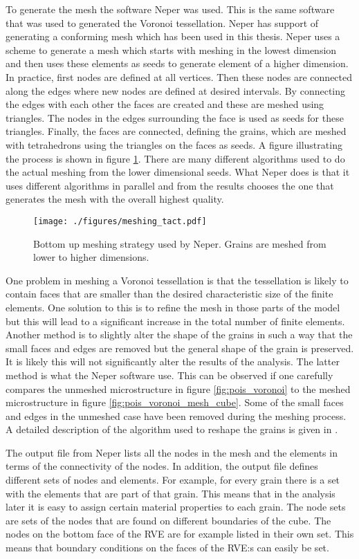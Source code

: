 \documentclass[meshing_micro.tex]{subfiles}
\begin{document}
To generate the mesh the software Neper\cite{Quey20111729} was used. 
This is the same software that was used to generated the Voronoi tessellation. Neper has support of generating a conforming mesh which has been used in this thesis. Neper uses a scheme to generate a mesh which starts with meshing in the lowest dimension and then uses these elements as seeds to generate element of a higher dimension.  In practice, first nodes are defined at all vertices. Then these nodes are connected along the edges where new nodes are defined at desired intervals. 
By connecting the edges with each other the faces are created and these are meshed using triangles. The nodes in the edges surrounding the face is used as seeds for these triangles. Finally, the faces are connected, defining the grains, which are meshed with tetrahedrons using the triangles on the faces as seeds. A figure illustrating the process is shown in figure \ref{fig:mesh_strat}. There are many different algorithms used to do the actual meshing from the lower dimensional seeds. 
What Neper does is that it uses different algorithms in parallel and from the results chooses the one that generates the mesh with the overall highest quality.

 \begin{figure}[htpb!]
\centering
  \texttt{[image: ./figures/meshing\_tact.pdf]}
\caption{Bottom up meshing strategy used by Neper. Grains are meshed from lower to higher dimensions.}
\label{fig:mesh_strat}
\end{figure}


One problem in meshing a Voronoi tessellation is that the tessellation is likely to contain faces that are smaller than the desired characteristic size of the finite elements. One solution to this is to refine the mesh in those parts of the model but this will lead to a significant increase in the total number of finite elements.  Another method is to slightly alter the shape of the grains in such a way that the small faces and edges are removed but the general shape of the grain is preserved. It is likely this will not significantly alter the results of the analysis. The latter method is what the Neper software use. This can be observed if one carefully compares the unmeshed microstructure in figure \ref{fig:pois_voronoi} to the meshed microstructure in figure \ref{fig:pois_voronoi_mesh_cube}. Some of the small faces and edges in the unmeshed case have been removed during the meshing process. A detailed description of the algorithm used to reshape the grains is given in \cite{Quey20111729}.
 
The output file from Neper lists all the nodes in the mesh and the elements in terms of the connectivity of the nodes. In addition, the output file defines different sets of nodes and elements. For example, for every grain there is a set with the elements that are part of that grain. This means that in the analysis later it is easy to assign certain material properties to each grain. The node sets are sets of the nodes that are found on different boundaries of the cube. The nodes on the bottom face of the RVE are for example listed in their own set. This means that boundary conditions on the faces of the RVE:s can easily be set.
\end{document}
